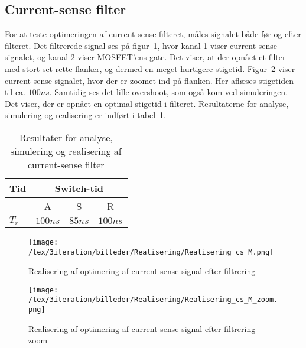 
\subsection{Current-sense filter}
For at teste optimeringen af current-sense filteret, måles signalet både før og efter filteret. Det filtrerede signal ses på figur~\ref{fig:Realisering_cs_M_3}, hvor kanal 1 viser current-sense signalet, og kanal 2 viser MOSFET'ens gate. Det viser, at der opnået et filter med stort set rette flanker, og dermed en meget hurtigere stigetid. Figur~\ref{fig:Realisering_cs_M_zoom_3} viser current-sense signalet, hvor der er zoomet ind på flanken. Her aflæses stigetiden til ca. $100ns$. Samtidig ses det lille overshoot, som også kom ved simuleringen. Det viser, der er opnået en optimal stigetid i filteret. Resultaterne for analyse, simulering og realisering er indført i tabel~\ref{tab:resultat_cs_filter_3}.

\begin{table}[H] 			
	\centering
	\begin{tabularx}{\textwidth}{|X|c|c|c|}
		\hline
		\textbf{Tid} & \multicolumn{3}{|c|}{\textbf{Switch-tid}} 										\\ \hline
		& A & S & R 									\\ \hline
		$T_{r}$ & $100ns$ & $85ns$ & $100ns$ 										\\ \hline 
	\end{tabularx}
	\caption{Resultater for analyse, simulering og realisering af current-sense filter}
	\label{tab:resultat_cs_filter_3}
\end{table}


\begin{figure}[H]
	\center
	\texttt{[image: /tex/3iteration/billeder/Realisering/Realisering\_cs\_M.png]}
	\caption{Realisering af optimering af current-sense signal efter filtrering}
	\label{fig:Realisering_cs_M_3}
\end{figure}

\begin{figure}[H]
	\center
	\texttt{[image: /tex/3iteration/billeder/Realisering/Realisering\_cs\_M\_zoom.png]}
	\caption{Realisering af optimering af current-sense signal efter filtrering - zoom}
	\label{fig:Realisering_cs_M_zoom_3}
\end{figure}